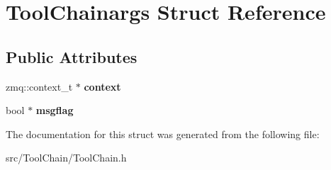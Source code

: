 \hypertarget{structToolChainargs}{\section{Tool\-Chainargs Struct Reference}
\label{structToolChainargs}
}
\subsection*{Public Attributes}
\begin{DoxyCompactItemize}
\item 
\hypertarget{structToolChainargs_a288a3015acf712919f128c216eecadad}{zmq\-::context\-\_\-t $\ast$ {\bfseries context}}\label{structToolChainargs_a288a3015acf712919f128c216eecadad}

\item 
\hypertarget{structToolChainargs_a3551269b039d543b844a2d0d924ce96b}{bool $\ast$ {\bfseries msgflag}}\label{structToolChainargs_a3551269b039d543b844a2d0d924ce96b}

\end{DoxyCompactItemize}


The documentation for this struct was generated from the following file\-:\begin{DoxyCompactItemize}
\item 
src/\-Tool\-Chain/Tool\-Chain.\-h\end{DoxyCompactItemize}
